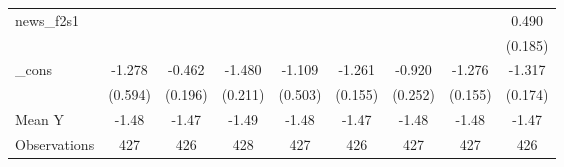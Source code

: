 {\begin{tabular}{l*{8}{c}}
\addlinespace
news\_f2s1   &                     &                     &                     &                     &                     &                     &                     &       0.490\sym{**} \\
            &                     &                     &                     &                     &                     &                     &                     &     (0.185)         \\
\addlinespace
\_cons      &      -1.278\sym{**} &      -0.462\sym{**} &      -1.480\sym{***}&      -1.109\sym{**} &      -1.261\sym{***}&      -0.920\sym{***}&      -1.276\sym{***}&      -1.317\sym{***}\\
            &     (0.594)         &     (0.196)         &     (0.211)         &     (0.503)         &     (0.155)         &     (0.252)         &     (0.155)         &     (0.174)         \\
\midrule
Mean Y      &       -1.48         &       -1.47         &       -1.49         &       -1.48         &       -1.47         &       -1.48         &       -1.48         &       -1.47         \\
Observations&         427         &         426         &         428         &         427         &         426         &         427         &         427         &         426         \\
\bottomrule
\end{tabular}
}
